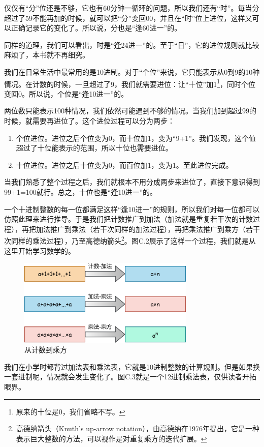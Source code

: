 仅仅有``分''位还是不够，它也有60分钟一循环的问题，所以我们还有``时''。每当分超过了59不能再加的时候，就可以把``分''变回00，并且在``时''位上进位，这样又可以正确记录它的变化了。所以说，分也是``逢60进一''的。\par
同样的道理，我们可以看出，时是``逢24进一''的。至于``日''，它的进位规则就比较麻烦了，本书就不再细究。\par
我们在日常生活中最常用的是10进制。对于``个位''来说，它只能表示从0到9的10种情况。在计数的时候，一旦超过了9，我们就需要进位：让``十位''加1\footnote{原来的十位是0，我们省略不写。}，同时个位变回0。所以说，个位是``逢10进一''的。\par
两位数只能表示100种情况，我们依然可能遇到不够的情况。当我们加到超过99的时候，就需要再进位了。这个进位过程可以分为两步：
\begin{enumerate}
    \item 个位进位。进位之后个位变为0，而十位加1，变为``9+1''。我们发现，这个值超过了十位能表示的范围，所以十位也需要进位。
    \item 十位进位。进位之后十位变为0，而百位加1，变为1。至此进位完成。
\end{enumerate}
当我们熟悉了整个过程之后，我们就根本不用分成两步来进位了，直接下意识得到99+1=100就行。总之，十位也是``逢10进一''的。\par
一个十进制整数的每一位都满足这样``逢10进一''的规则，所以我们对每一位都可以仿照此理来进行推导。于是我们把计数推广到加法（加法就是重复若干次的计数过程），再把加法推广到乘法（若干次同样的加法过程），再把乘法推广到乘方（若干次同样的乘法过程），乃至高德纳箭头\footnote{高德纳箭头（Knuth's up-arrow notation），由高德纳在1976年提出，它是一种表示巨大整数的方法，可以视作是对重复乘方的迭代扩展。}。图C.2展示了这样一个过程，我们就是从这里开始学习数学的。\par
\begin{figure}[htbp]
    \centering
    \includegraphics[width=0.75\textwidth]{../images/other_parts/C_from_counting_to_exponentiation.png}
    \caption{从计数到乘方}
\end{figure}
我们在小学时都背过加法表和乘法表，它就是10进制整数的计算规则。但是如果换一套进制呢，情况就会发生变化了。图C.3就是一个12进制乘法表，仅供读者开拓眼界。\par
